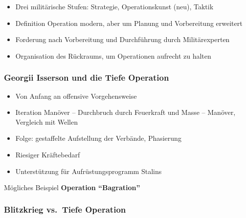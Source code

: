 {}\documentclass[a4paper]{article}
\providecommand{\tightlist}{\setlength{\itemsep}{1mm}\setlength{\parskip}{1mm}}
\begin{document}
\begin{itemize}
	\tightlist
	\item
	      Drei militärische Stufen: Strategie, Operationskunst (neu), Taktik
	\item
	      Definition Operation modern, aber um Planung und Vorbereitung
	      erweitert
	\item
	      Forderung nach Vorbereitung und Durchführung durch Militärexperten
	\item
	      Organisation des Rückraums, um Operationen aufrecht zu halten
\end{itemize}

\subsubsection{Georgii Isserson und die Tiefe
	Operation}\label{georgii-isserson-und-die-tiefe-operation}

\begin{itemize}
	\tightlist
	\item
	      Von Anfang an offensive Vorgehensweise
	\item
	      Iteration Manöver -- Durchbruch durch Feuerkraft und Masse -- Manöver,
	      Vergleich mit Wellen
	\item
	      Folge: gestaffelte Aufstellung der Verbände, Phasierung
	\item
	      Riesiger Kräftebedarf
	\item
	      Unterstützung für Aufrüstungsprogramm Stalins
\end{itemize}

Mögliches Beispiel \textbf{Operation ``Bagration''}

\subsubsection{Blitzkrieg vs.~Tiefe
	Operation}\label{blitzkrieg-vs.-tiefe-operation}
\end{document}
